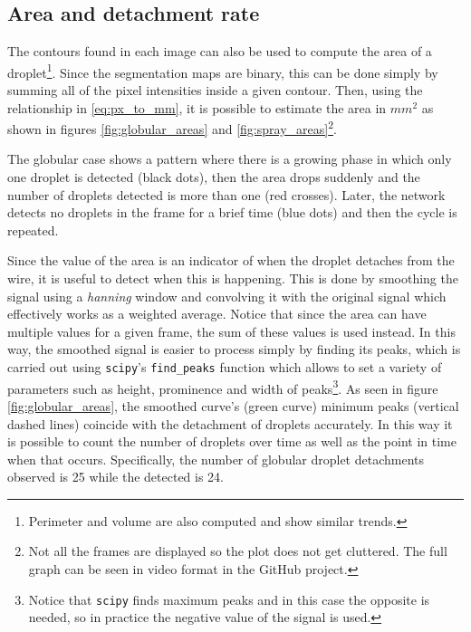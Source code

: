 \subsection{Area and detachment rate}

The contours found in each image can also be used to compute the area of a droplet\footnote{Perimeter and volume are also computed and show similar trends.}. Since the segmentation maps are binary, this can be done simply by summing all of the pixel intensities inside a given contour. Then, using the relationship in \eqref{eq:px_to_mm}, it is possible to estimate the area in $mm^2$ as shown in figures \ref{fig:globular_areas} and \ref{fig:spray_areas}\footnote{Not all the frames are displayed so the plot does not get cluttered. The full graph can be seen in video format in the GitHub project.}.

The globular case shows a pattern where there is a growing phase in which only one droplet is detected (black dots), then the area drops suddenly and the number of droplets detected is more than one (red crosses). Later, the network detects no droplets in the frame for a brief time (blue dots) and then the cycle is repeated.

Since the value of the area is an indicator of when the droplet detaches from the wire, it is useful to detect when this is happening. This is done by smoothing the signal using a \textit{hanning} window and convolving it with the original signal which effectively works as a weighted average. Notice that since the area can have multiple values for a given frame, the sum of these values is used instead. In this way, the smoothed signal is easier to process simply by finding its peaks, which is carried out using \texttt{scipy}'s \texttt{find\_peaks} function which allows to set a variety of parameters such as height, prominence and width of peaks\footnote{Notice that \texttt{scipy} finds maximum peaks and in this case the opposite is needed, so in practice the negative value of the signal is used.}. As seen in figure \ref{fig:globular_areas}, the smoothed curve's (green curve) minimum peaks (vertical dashed lines) coincide with the detachment of droplets accurately. In this way it is possible to count the number of droplets over time as well as the point in time when that occurs. Specifically, the number of globular droplet detachments observed is 25 while the detected is 24.

